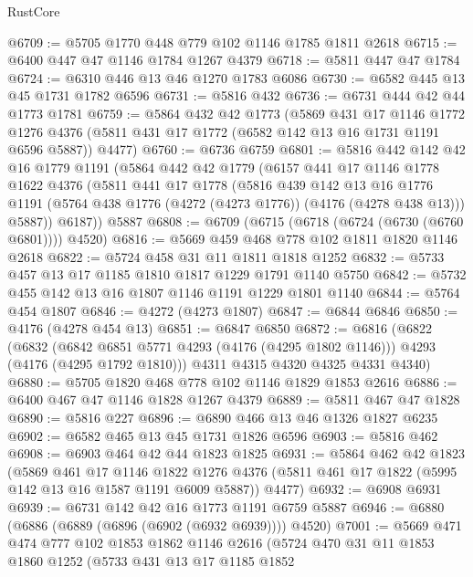 \begin{lexlean}{RustCore}
\begin{coremodule}
@6709 := @5705 @1770 @448 @779 @102 @1146 @1785 @1811 @2618
@6715 := @6400 @447 @47 @1146 @1784 @1267 @4379
@6718 := @5811 @447 @47 @1784
@6724 := @6310 @446 @13 @46 @1270 @1783 @6086
@6730 := @6582 @445 @13 @45 @1731 @1782 @6596
@6731 := @5816 @432
@6736 := @6731 @444 @42 @44 @1773 @1781
@6759 := @5864
    @432
    @42
    @1773
    (@5869
      @431
      @17
      @1146
      @1772
      @1276
      @4376
      (@5811 @431 @17 @1772 (@6582 @142 @13 @16 @1731 @1191 @6596 @5887))
      @4477)
@6760 := @6736 @6759
@6801 := @5816
    @442
    @142
    @42
    @16
    @1779
    @1191
    (@5864
      @442
      @42
      @1779
      (@6157
        @441
        @17
        @1146
        @1778
        @1622
        @4376
        (@5811
          @441
          @17
          @1778
          (@5816
            @439
            @142
            @13
            @16
            @1776
            @1191
            (@5764 @438 @1776 (@4272 (@4273 @1776)) (@4176 (@4278 @438 @13)))
            @5887))
        @6187))
    @5887
@6808 := @6709 (@6715 (@6718 (@6724 (@6730 (@6760 @6801)))) @4520)
@6816 := @5669 @459 @468 @778 @102 @1811 @1820 @1146 @2618
@6822 := @5724 @458 @31 @11 @1811 @1818 @1252
@6832 := @5733 @457 @13 @17 @1185 @1810 @1817 @1229 @1791 @1140 @5750
@6842 := @5732 @455 @142 @13 @16 @1807 @1146 @1191 @1229 @1801 @1140
@6844 := @5764 @454 @1807
@6846 := @4272 (@4273 @1807)
@6847 := @6844 @6846
@6850 := @4176 (@4278 @454 @13)
@6851 := @6847 @6850
@6872 := @6816
    (@6822
      (@6832
        (@6842 @6851 @5771 @4293 (@4176 (@4295 @1802 @1146)))
        @4293
        (@4176 (@4295 @1792 @1810)))
      @4311
      @4315
      @4320
      @4325
      @4331
      @4340)
@6880 := @5705 @1820 @468 @778 @102 @1146 @1829 @1853 @2616
@6886 := @6400 @467 @47 @1146 @1828 @1267 @4379
@6889 := @5811 @467 @47 @1828
@6890 := @5816 @227
@6896 := @6890 @466 @13 @46 @1326 @1827 @6235
@6902 := @6582 @465 @13 @45 @1731 @1826 @6596
@6903 := @5816 @462
@6908 := @6903 @464 @42 @44 @1823 @1825
@6931 := @5864
    @462
    @42
    @1823
    (@5869
      @461
      @17
      @1146
      @1822
      @1276
      @4376
      (@5811 @461 @17 @1822 (@5995 @142 @13 @16 @1587 @1191 @6009 @5887))
      @4477)
@6932 := @6908 @6931
@6939 := @6731 @142 @42 @16 @1773 @1191 @6759 @5887
@6946 := @6880 (@6886 (@6889 (@6896 (@6902 (@6932 @6939)))) @4520)
@7001 := @5669
    @471
    @474
    @777
    @102
    @1853
    @1862
    @1146
    @2616
    (@5724
      @470
      @31
      @11
      @1853
      @1860
      @1252
      (@5733
        @431
        @13
        @17
        @1185
        @1852

\end{coremodule}
\end{lexlean}
